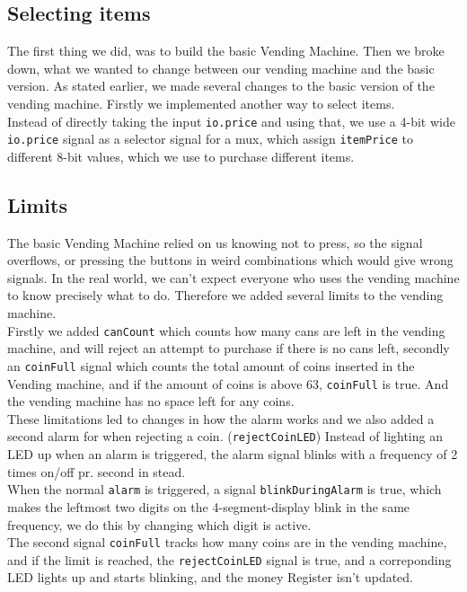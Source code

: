 \subsection{Selecting items}
The first thing we did, was to build the basic Vending Machine. Then we broke down, what we wanted to change between our vending machine and the basic version. As stated earlier, we made several changes to the basic version of the vending machine. Firstly we implemented another way to select items. \\
Instead of directly taking the input \texttt{io.price} and using that, we use a 4-bit wide \texttt{io.price} signal as a selector signal for a mux, which assign \texttt{itemPrice} to different 8-bit values, which we use to purchase different items.\\
\subsection{Limits}
The basic Vending Machine relied on us knowing not to press, so the signal overflows, or pressing the buttons in weird combinations which would give wrong signals. In the real world, we can't expect everyone who uses the vending machine to know precisely what to do. Therefore we added several limits to the vending machine. \\
Firstly we added \texttt{canCount} which counts how many cans are left in the vending machine, and will reject an attempt to purchase if there is no cans left, secondly an \texttt{coinFull} signal which counts the total amount of coins inserted in the Vending machine, and if the amount of coins is above 63, \texttt{coinFull} is true. And the vending machine has no space left for any coins.\\
These limitations led to changes in how the alarm works and we also added a second alarm for when rejecting a coin. (\texttt{rejectCoinLED}) Instead of lighting an LED up when an alarm is triggered, the alarm signal blinks with a frequency of 2 times on/off pr. second in stead. \\
When the normal \texttt{alarm} is triggered, a signal \texttt{blinkDuringAlarm} is true, which makes the leftmost two digits on the 4-segment-display blink in the same frequency, we do this by changing which digit is active.\\ 
The second signal \texttt{coinFull} tracks how many coins are in the vending machine, and if the limit is reached, the \texttt{rejectCoinLED} signal is true, and a correponding LED lights up and starts blinking, and the money Register isn't updated. \\
